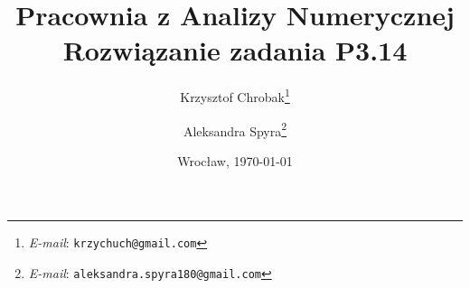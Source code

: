\documentclass[12pt,a4paper,wide,authortitle]{mwart}
\numberwithin{figure}{section}
\numberwithin{table}{section}
\begin{document}
\title{\LARGE \textbf{Pracownia z Analizy Numerycznej}\\Rozwiązanie zadania P3.14}
\author{Krzysztof Chrobak\thanks{\textit{E-mail}:
\texttt{krzychuch@gmail.com}} \and Aleksandra Spyra\thanks{\textit{E-mail}:
\texttt{aleksandra.spyra180@gmail.com}}}
\date {Wrocław, \today}
\maketitle
\tableofcontents
\newpage






\end{document}
